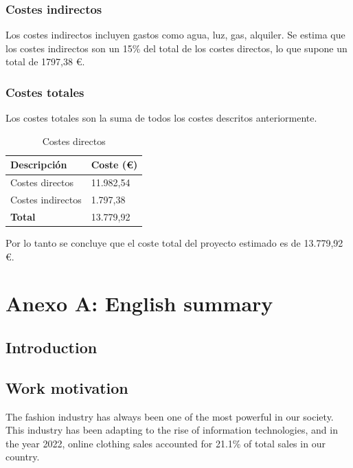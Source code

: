 \documentclass[12pt]{report} %
\begin{document}
	\subsection{Costes indirectos}
	Los costes indirectos incluyen gastos como agua, luz, gas, alquiler. Se estima que los costes indirectos son un 15\% del total
	de los costes directos, lo que supone un total de 1797,38 €.
	\subsection{Costes totales}

	Los costes totales son la suma de todos los costes descritos anteriormente.
	\begin{table}[H]
		\centering
		\caption{Costes directos}
		\begin{tabular}{ll}
				\toprule
				\textbf{Descripción} & \textbf{Coste (€)}\\
				\midrule
				Costes directos & 11.982,54  \\
				Costes indirectos & 1.797,38  \\
				\bottomrule
				\textbf{Total} & 13.779,92
		\end{tabular}
	\end{table}
	Por lo tanto se concluye que el coste total del proyecto estimado es de 13.779,92 €.



\nocite{*} %

\clearpage
{}
\printbibliography




\chapter* {Anexo A: English summary}

\section*{Introduction}
\section*{Work motivation}
The fashion industry has always been one of the most powerful in our society. This industry has been adapting to the rise of information technologies, and in the year 2022, online clothing sales accounted for 21.1\% of total sales in our country.
\end{document}
